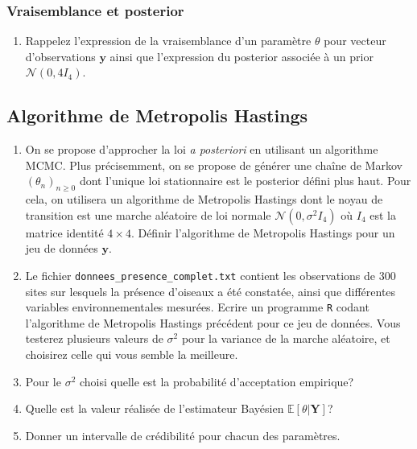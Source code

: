 \documentclass[]{article}
\providecommand{\tightlist}{%
  \setlength{\itemsep}{0pt}\setlength{\parskip}{0pt}}
\begin{document}
\hypertarget{vraisemblance-et-posterior}{%
\subsubsection{Vraisemblance et
posterior}\label{vraisemblance-et-posterior}}

\begin{enumerate}
\def\labelenumi{\arabic{enumi}.}
\tightlist
\item
  Rappelez l'expression de la vraisemblance d'un paramètre \(\theta\)
  pour vecteur d'observations \(\mathbf{y}\) ainsi que l'expression du
  posterior associée à un prior \(\mathcal{N}(0, 4I_4)\).
\end{enumerate}

\hypertarget{algorithme-de-metropolis-hastings}{%
\subsection{Algorithme de Metropolis
Hastings}\label{algorithme-de-metropolis-hastings}}

\begin{enumerate}
\def\labelenumi{\arabic{enumi}.}
\setcounter{enumi}{1}
\item
  On se propose d'approcher la loi \emph{a posteriori} en utilisant un
  algorithme MCMC. Plus précisemment, on se propose de générer une
  chaîne de Markov \((\theta_n)_{n\geq 0}\) dont l'unique loi
  stationnaire est le posterior défini plus haut. Pour cela, on
  utilisera un algorithme de Metropolis Hastings dont le noyau de
  transition est une marche aléatoire de loi normale
  \(\mathcal{N}(0, \sigma^2 I_4)\) où \(I_4\) est la matrice identité
  \(4\times 4\). Définir l'algorithme de Metropolis Hastings pour un jeu
  de données \(\mathbf{y}\).
\item
  Le fichier \texttt{donnees\_presence\_complet.txt} contient les
  observations de 300 sites sur lesquels la présence d'oiseaux a été
  constatée, ainsi que différentes variables environnementales mesurées.
  Ecrire un programme \texttt{R} codant l'algorithme de Metropolis
  Hastings précédent pour ce jeu de données. Vous testerez plusieurs
  valeurs de \(\sigma^2\) pour la variance de la marche aléatoire, et
  choisirez celle qui vous semble la meilleure.
\item
  Pour le \(\sigma^2\) choisi quelle est la probabilité d'acceptation
  empirique?
\item
  Quelle est la valeur réalisée de l'estimateur Bayésien
  \(\mathbb{E}[\theta \vert \mathbf{Y}]\)?
\item
  Donner un intervalle de crédibilité pour chacun des paramètres.
\end{enumerate}
\end{document}
